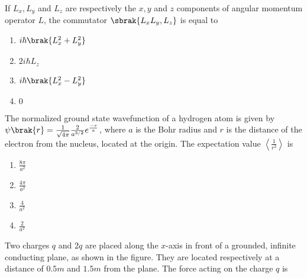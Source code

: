 \iffalse
\chapter{2011}
\author{AI24BTECH11020}
\section{ph}
\fi

\item If $L_x,L_y$ and $L_z$ are respectively the $x,y$ and $z$ components of angular momentum operator $L$, the commutator $\sbrak{L_xL_y,L_z}$ is equal to
		\begin{enumerate}
        \item $i\hbar\brak{L_x^2+L_y^2}$
	\item $2i\hbar L_z$
	\item $i\hbar\brak{L_x^2-L_y^2}$
	\item $0$
		\end{enumerate}
\item The normalized ground state wavefunction of a hydrogen atom is given by $\psi\brak{r}=\frac{1}{\sqrt{4\pi}}\frac{2}{a^{3/2}}e^{\frac{-r}{a}}$, where $a$ is the Bohr radius and $r$ is the distance of the electron from the nucleus, located at the origin. The expectation value $\left\langle \frac{1}{r^2} \right\rangle$ is 
		\begin{enumerate}
			\item $\frac{8\pi}{a^2}$
			\item $\frac{4\pi}{a^2}$
			\item $\frac{4}{a^2}$
			\item $\frac{2}{a^2}$
		\end{enumerate}
\item Two charges $q$ and $2q$ are placed along the $x$-axis in front of a grounded, infinite conducting plane, as shown in the figure. They are located respectively at a distance of $0.5 m$ and $1.5 m$ from the plane. The force acting on the charge $q$ is\\
